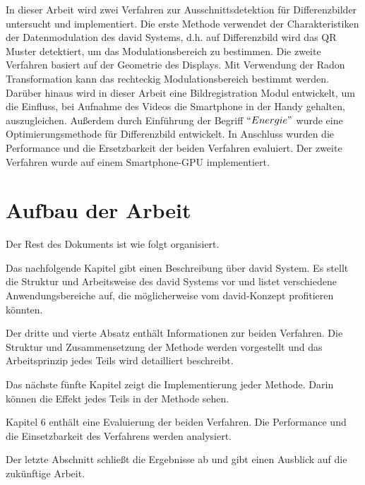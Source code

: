 In dieser Arbeit wird zwei Verfahren zur Ausschnittsdetektion für Differenzbilder untersucht und implementiert. Die erste Methode verwendet der Charakteristiken der Datenmodulation des \gls{david} Systems, d.h. auf Differenzbild wird das QR Muster detektiert, um das Modulationsbereich zu bestimmen. Die zweite Verfahren basiert auf der Geometrie des Displays. Mit Verwendung der Radon Transformation kann das rechteckig Modulationsbereich bestimmt werden. Darüber hinaus wird in dieser Arbeit eine Bildregistration Modul entwickelt, um die Einfluss, bei Aufnahme des Videos die Smartphone in der Handy gehalten, auszugleichen. Außerdem durch Einführung der Begriff $ ``Energie" $ wurde eine Optimierungsmethode für Differenzbild entwickelt. In Anschluss wurden die Performance und die Ersetzbarkeit der beiden Verfahren evaluiert. Der zweite Verfahren wurde auf einem Smartphone-GPU implementiert.

\section{Aufbau der Arbeit} 

Der Rest des Dokuments ist wie folgt organisiert.

Das nachfolgende Kapitel gibt einen Beschreibung über \gls{david} System. Es stellt die Struktur und Arbeitsweise des \gls{david} Systems vor und listet verschiedene Anwendungsbereiche auf, die möglicherweise vom \gls{david}-Konzept profitieren könnten.

Der dritte und vierte Absatz enthält Informationen zur beiden Verfahren. Die Struktur und Zusammensetzung der Methode werden vorgestellt und das Arbeitsprinzip jedes Teils wird detailliert beschreibt.

Das nächste fünfte Kapitel zeigt die Implementierung jeder Methode. Darin können die Effekt jedes Teils in der Methode sehen. %

Kapitel 6 enthält eine Evaluierung der beiden Verfahren. Die Performance und die Einsetzbarkeit des Verfahrens werden analysiert.

Der letzte Abschnitt schließt die Ergebnisse ab und gibt einen Ausblick auf die zukünftige Arbeit.